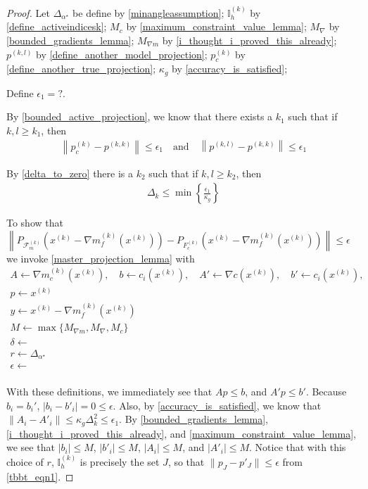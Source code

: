 \documentclass{article}
\theoremstyle{case}
\numberwithin{theorem}{subsection}
\newcommand{\dk}{\Delta_k}
\newcommand{\feasiblek}{{\mathcal F_m^{(k)}}}
\newcommand{\gk}{{\nabla m_f^{(k)}\left(\xk\right)}}
\newcommand{\maxgrad}{{M_{\nabla}}}
\newcommand{\minangledelta}{{\Delta_{\alpha^{\star}}}}
\newcommand{\xk}{x^{(k)}}
\newcommand{\projkl}{{p^{(k,l)}}}
\newcommand{\projkk}{{p^{(k,k)}}}
\newcommand{\trueprojk}{{p_c^{(k)}}}
\newcommand{\truefeasiblek}{{F_c^{(k)}}}
\newcommand{\maxmodelgrad}{{M_{\nabla m}}}
\newcommand{\activeindicesk}{{ \mathbb I_h^{(k)} }}
\newcommand{\modeljack}{{ \nabla m^{(k)}_{c}\left(\xk\right) }}
\newcommand{\truejack}{{ \nabla c\left(\xk\right) }}
\begin{document}
\begin{proof}
Let 
$\minangledelta$ be define by \cref{minangleassumption};
$\activeindicesk$ by \cref{define_activeindicesk};
$M_c$ by \cref{maximum_constraint_value_lemma};
$\maxgrad$ by \cref{bounded_gradients_lemma};
$\maxmodelgrad$ by \cref{i_thought_i_proved_this_already};
$\projkl$ by \cref{define_another_model_projection};
$\trueprojk$ by \cref{define_another_true_projection};
$\kappa_g$ by \cref{accuracy_is_satisfied};

Define $\epsilon_1 = ?$.






By \cref{bounded_active_projection}, we know that there exists a $k_1$ such that if $k, l \ge k_1$, then
\begin{align}
\label{tbbt_eqn1}
\left\| \trueprojk - \projkk \right\| \le \epsilon_1 \quad \textrm{and} \quad
\left\| \projkl - \projkk \right\| \le \epsilon_1
\end{align}


By \cref{delta_to_zero} there is a $k_2$ such that if $k, l \ge k_2$, then
\begin{align*}
\dk \le \min\left\{\frac{\epsilon_1}{\kappa_g} \right\}
\end{align*}



To show that
$\left\| P_{\feasiblek}\left(\xk - \gk\right) - P_{\truefeasiblek}\left(\xk - \gk\right) \right\| \le \epsilon$
we invoke \cref{master_projection_lemma} with 
\begin{align*}
A			\gets \modeljack, \quad
b			\gets c_i\left(\xk\right), \quad
A'			\gets \truejack, \quad
b'			\gets c_i\left(\xk\right), \\
p			\gets \xk \\
y			\gets \xk - \gk \\
M			\gets \max\{\maxmodelgrad, \maxgrad, M_c\}\\
\delta		\gets \\
r			\gets \minangledelta \\
\epsilon	\gets \\
\end{align*}

With these definitions, we immediately see that $Ap \le b$, and $A'p \le b'$.
Because $b_i = b_i'$, $|b_i - b'_i| = 0 \le \epsilon$.
Also, by \cref{accuracy_is_satisfied}, we know that $\left\|A_i - A'_i \right\| \le \kappa_g \dk^2 \le \epsilon_1$.
By \cref{bounded_gradients_lemma}, \cref{i_thought_i_proved_this_already}, and \cref{maximum_constraint_value_lemma}, we see that
$\left|b_i\right| \le M $, $\left|b'_i\right| \le M$,
$\left|A_i\right| \le M $, and $\left|A'_i\right| \le M$.
Notice that with this choice of $r$, $\activeindicesk$ is precisely the set $J$,
so that $\|p_J - p'_J\| \le \epsilon$ from \cref{tbbt_eqn1}.


\end{proof}
\end{document}
